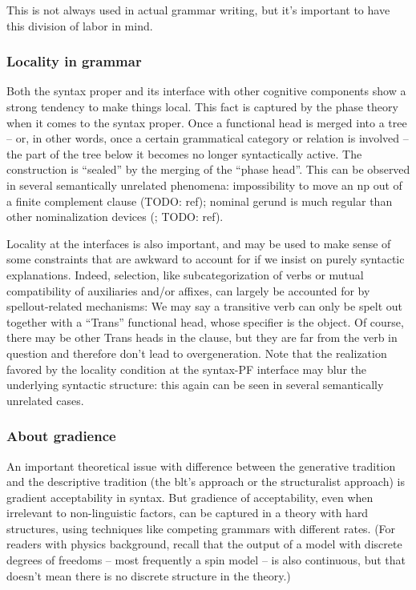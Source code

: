 \documentclass[UTF8, a4paper, oneside, scheme=plain]{ctexrep}
\newcommand*{\citepage}[1]{p.~{#1}}
\begin{document}
This is not always used in actual grammar writing,
but it's important to have this division of labor in mind.

\subsubsection{Locality in grammar}

Both the syntax proper and its interface with other cognitive components 
show a strong tendency to make things local.
This fact is captured by the phase theory when it comes to the syntax proper.
Once a functional head is merged into a tree 
-- or, in other words, once a certain grammatical category or relation is involved -- 
the part of the tree below it becomes no longer syntactically active.
The construction is ``sealed'' by the merging of the ``phase head''.
This can be observed in several semantically unrelated phenomena:
impossibility to move an \acs{np} out of a finite complement clause (TODO: ref);
nominal gerund is much regular than other nominalization devices 
(\citealt[\citepage{11}]{embick2010localism}; TODO: ref). %

Locality at the interfaces is also important,
and may be used to make sense of some constraints 
that are awkward to account for if we insist on purely syntactic explanations.
Indeed, selection, 
like subcategorization of verbs or mutual compatibility of auxiliaries and/or affixes,
can largely be accounted for by spellout-related mechanisms:
We may say a transitive verb can only be spelt out 
together with a ``Trans'' functional head,
whose specifier is the object. 
Of course, there may be other Trans heads in the clause,
but they are far from the verb in question and therefore don't lead to overgeneration.
Note that the realization favored by the locality condition at the 
syntax-PF interface may blur the underlying syntactic structure:
this again can be seen in several semantically unrelated cases. %

\subsubsection{About gradience}

An important theoretical issue with difference between the generative tradition 
and the descriptive tradition (the \acs{blt}'s approach or the structuralist approach)
is gradient acceptability in syntax.
But gradience of acceptability, 
even when irrelevant to non-linguistic factors, 
can be captured in a theory with hard structures,
using techniques like competing grammars with different rates.
(For readers with physics background,
recall that the output of a model with discrete degrees of freedoms 
-- most frequently a spin model -- is also continuous,
but that doesn't mean there is no discrete structure in the theory.)
\end{document}
